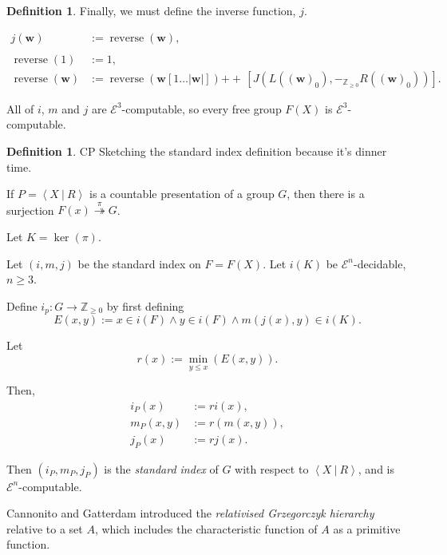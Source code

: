 \documentclass[a4paper]{article}
\newcommand{\grz}[1]{$\mathcal{E}^{#1}$}	%
\newcommand{\Zpos}{\mathbb{Z}_{\geq 0}}
\newcommand{\wvec}{\mathbf{w}}	%
\newcommand{\concat}{\ensuremath{+\!\!\!\!+\,}}	%
\newcommand{\present}[2]{\left \langle #1 \: | \: #2 \right \rangle}	%
\theoremstyle{plain}
\theoremstyle{definition}
\newtheorem{definition}[theorem]{Definition}
\newenvironment{cpe}{\noindent\color{OliveGreen} CP }{}
\newcommand{\cp}[1]{
\begin{cpe} #1 \end{cpe}}
\begin{document}
\begin{definition}
Finally, we must define the inverse function, $j$.

\begin{align}
	j(\wvec) &:= \operatorname{reverse}(\wvec),  \\
	\nonumber \\
	\operatorname{reverse}(1) &:= 1, \\
	\operatorname{reverse}(\wvec) &:= \operatorname{reverse}(\wvec[1 \dots |\wvec|]) \concat [J(L((\wvec)_0),-_{\Zpos}R((\wvec)_0))].
\end{align}

All of $i$, $m$ and $j$ are \grz{3}-computable, so every free group $F(X)$ is \grz{3}-computable.

\end{definition}

\begin{definition}
	\cp{ Sketching the standard index definition because it's dinner time. }

	If $P = \present{X}{R}$ is a countable presentation of a group $G$, then there is a surjection $F(x) \overset{\pi}{\twoheadrightarrow} G$.
	
	Let $K = \operatorname{ker}(\pi).$

	Let $(i,m,j)$ be the standard index on $F = F(X)$. Let $i(K)$ be \grz{n}-decidable, $n \geq 3$.

	Define $i_p: G \rightarrow \Zpos$ by first defining
	\[ E(x,y) := x \in i(F) \wedge y \in i(F) \wedge m(j(x),y) \in i(K). \]

	Let \begin{equation} r(x) := \min_{y \leq x} \left( E(x,y) \right). \end{equation}

	Then,
	\begin{align}
		i_P(x) &:= r i(x), \\
		m_P(x,y) &:= r(m(x,y)), \\
		j_P(x) &:= r j(x).
	\end{align}

	Then $(i_P,m_P,j_P)$ is the {\it standard index} of $G$ with respect to $\present{X}{R}$, and is \grz{n}-computable.

\end{definition}

Cannonito and Gatterdam \cite{Cannonito_1973} introduced the {\it relativised Grzegorczyk hierarchy} relative to a set $A$, which includes the characteristic function of $A$ as a primitive function.
\end{document}
